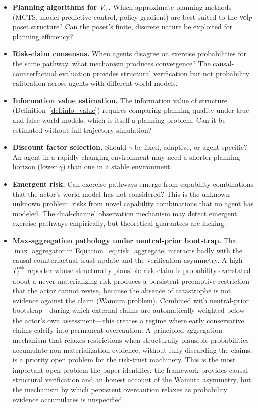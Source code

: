 \begin{itemize}
\item \textbf{Planning algorithms for $V_\gamma$.} Which approximate planning
  methods (MCTS, model-predictive control, policy gradient) are best suited
  to the ${\operatorname{vol}_{\mathrm{P}}}$ poset structure? Can the poset's finite, discrete nature be
  exploited for planning efficiency?

\item \textbf{Risk-claim consensus.} When agents disagree on exercise
  probabilities for the same pathway, what mechanism produces convergence?
  The causal-counterfactual evaluation provides structural verification but
  not probability calibration across agents with different world models.

\item \textbf{Information value estimation.} The information value of
  structure (Definition~\ref{def:info_value}) requires comparing planning
  quality under true and false world models, which is itself a planning
  problem. Can it be estimated without full trajectory simulation?

\item \textbf{Discount factor selection.} Should $\gamma$ be fixed, adaptive,
  or agent-specific? An agent in a rapidly changing environment may need a
  shorter planning horizon (lower $\gamma$) than one in a stable environment.

\item \textbf{Emergent risk.} Can exercise pathways emerge from capability
  combinations that the actor's world model has not considered? This is the
  unknown-unknown problem: risks from novel capability combinations that no
  agent has modeled. The dual-channel observation mechanism may detect
  emergent exercise pathways empirically, but theoretical guarantees are
  lacking.

\item \textbf{Max-aggregation pathology under neutral-prior bootstrap.}
  The $\max$ aggregator in
  Equation~\eqref{eq:risk_aggregate} interacts badly with the
  causal-counterfactual trust update and the verification asymmetry. A
  high-$T_j^{\mathrm{risk}}$ reporter whose structurally plausible risk
  claim is probability-overstated about a never-materializing risk
  produces a persistent preemptive restriction that the actor cannot
  revise, because the absence of catastrophe is not evidence against the
  claim (Wamura problem). Combined with neutral-prior bootstrap---during
  which external claims are automatically weighted below the actor's own
  assessment---this creates a regime where early conservative claims
  calcify into permanent overcaution. A principled aggregation mechanism
  that relaxes restrictions when structurally-plausible probabilities
  accumulate non-materialization evidence, without fully discarding
  the claims, is a priority open problem for the risk-trust machinery.
  This is the most important open problem the paper identifies: the
  framework provides causal-structural verification and an honest
  account of the Wamura asymmetry, but the mechanism by which
  persistent overcaution relaxes as probability evidence accumulates is
  unspecified.


\end{itemize}
